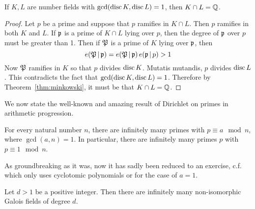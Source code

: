 \begin{cor} \label{cor:minkowski}
If $K,L$ are number fields with $\gcd(\operatorname{disc} K, \operatorname{disc} L)= 1$, then $K \cap L= \mathbb{Q}$. 
\end{cor}

\begin{proof}
Let $p$ be a prime and suppose that $p$ ramifies in $K \cap L$. Then $p$ ramifies in both $K$ and $L$. If $\mathfrak{p}$ is a prime of $K \cap L$ lying over $p$, then the degree of $\mathfrak{p}$ over $p$ must be greater than 1. Then if $\mathfrak{P}$ is a prime of $K$ lying over $\mathfrak{p}$, then
	\[
	e(\mathfrak{P} \,|\, \mathfrak{p})= e(\mathfrak{P} \,|\, \mathfrak{p})\, e(\mathfrak{p} \,|\, p) > 1 
	\]
Now $\mathfrak{P}$ ramifies in $K$ so that $p$ divides $\operatorname{disc} K$. Mutatis mutandis, $p$ divides $\operatorname{disc} L$. This contradicts the fact that $\gcd(\operatorname{disc} K, \operatorname{disc} L)= 1$. Therefore by Theorem~\ref{thm:minkowski}, it must be that $K \cap L= \mathbb{Q}$. 
\end{proof} 


We now state the well-known and amazing result of Dirichlet on primes in arithmetic progression. 


\begin{thm} \label{thm:dirichlet}
For every natural number $n$, there are infinitely many primes with $p \equiv a \mod n$, where $\gcd(a,n)= 1$. In particular, there are infinitely many primes $p$ with $p \equiv 1 \mod n$. 
\end{thm}


As groundbreaking as it was, now it has sadly been reduced to an exercise, c.f. \cite[Ch.~13.6, Ex.~8]{dummitfoote} which only uses cyclotomic polynomials or \cite[Ch.~1,\S10, Ex.~1]{neukirch} for the case of $a= 1$. 



\begin{lem} \label{lem:infgaloisfields}
Let $d>1$ be a positive integer. Then there are infinitely many non-isomorphic Galois fields of degree $d$. 
\end{lem}

